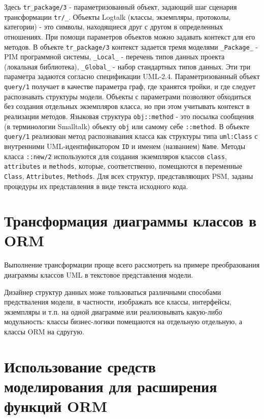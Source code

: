 \documentclass[12pt]{article}
\begin{document}
Здесь \texttt{tr\_package/3} - параметризованный объект, задающий шаг сценария трансформации \texttt{tr/\_}.  Объекты Logtalk (классы, экземпляры, протоколы, категории) - это символы, находящиеся друг с другом в определенных отношениях.  При помощи параметров объектов можно задавать контекст для его методов.  В объекте \texttt{tr\_package/3} контекст задается тремя моделями \texttt{\_Package\_} - PIM программной системы, \texttt{\_Local\_} - перечень типов данных проекта (локальная библиотека), \texttt{\_Global\_} - набор стандартных типов данных.  Эти три параметра задаются согласно спецификации UML-2.4.  Параметризованный объект \texttt{query/1} получает в качестве параметра граф, где хранятся тройки, и где следует распознавать структуры модели.  Объекты с параметрами позволяют обходиться без создания отдельных экземпляров класса, но при этом учитывать контекст в реализации методов.  Языковая структура \texttt{obj::method} - это посылка сообщения (в терминологии Smalltalk) объекту \texttt{obj} или самому себе \texttt{::method}.  В объекте \texttt{query/1} реализован метод распознавания класса как структуры типа \texttt{uml:Class} с внутренними UML-идентификатором \texttt{ID} и именем (названием) \texttt{Name}.  Методы класса \texttt{::new/2} используются для создания экземпляров классов \texttt{class}, \texttt{attributes} и \texttt{methods}, которые, соответственно, помещаются в переменные \texttt{Class}, \texttt{Attributes}, \texttt{Methods}.  Для всех структур, представляющих PSM, заданы процедуры их представления в виде текста исходного кода.

\section{Трансформация диаграммы классов в ORM}
\label{sec:trorm}

Выполнение трансформации проще всего рассмотреть на примере преобразования диаграммы классов UML в текстовое представления модели.

Дизайнер структур данных може тользоваться различными способами предстваления модели, в частности, изображать все классы, интерфейсы, экземпляры и т.п. на одной диаграмме или реализовывать какую-либо модульность: классы бизнес-логики помещаются на отдельную отдельную, а классы ORM на сдругую.

\section{Использование средств моделирования для расширения функций ORM}
\end{document}
